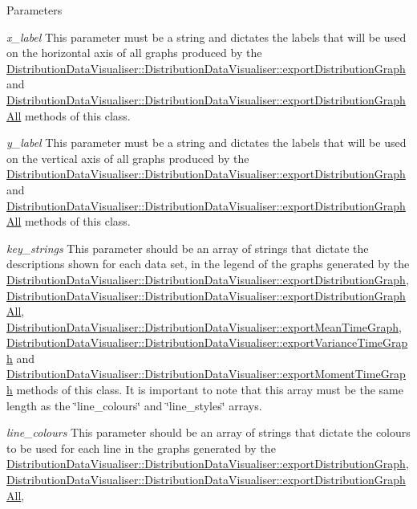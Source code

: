 \begin{DoxyParams}{Parameters}
\item[{\em x\_\-label}]This parameter must be a string and dictates the labels that will be used on the horizontal axis of all graphs produced by the \hyperlink{class_distribution_data_visualiser_1_1_distribution_data_visualiser_af94d7669b055348a4c702ea452e7bec7}{DistributionDataVisualiser::DistributionDataVisualiser::exportDistributionGraph} and \hyperlink{class_distribution_data_visualiser_1_1_distribution_data_visualiser_ab3c06a75bb9d6eaf77e9b81677473079}{DistributionDataVisualiser::DistributionDataVisualiser::exportDistributionGraphAll} methods of this class. \item[{\em y\_\-label}]This parameter must be a string and dictates the labels that will be used on the vertical axis of all graphs produced by the \hyperlink{class_distribution_data_visualiser_1_1_distribution_data_visualiser_af94d7669b055348a4c702ea452e7bec7}{DistributionDataVisualiser::DistributionDataVisualiser::exportDistributionGraph} and \hyperlink{class_distribution_data_visualiser_1_1_distribution_data_visualiser_ab3c06a75bb9d6eaf77e9b81677473079}{DistributionDataVisualiser::DistributionDataVisualiser::exportDistributionGraphAll} methods of this class. \item[{\em key\_\-strings}]This parameter should be an array of strings that dictate the descriptions shown for each data set, in the legend of the graphs generated by the \hyperlink{class_distribution_data_visualiser_1_1_distribution_data_visualiser_af94d7669b055348a4c702ea452e7bec7}{DistributionDataVisualiser::DistributionDataVisualiser::exportDistributionGraph}, \hyperlink{class_distribution_data_visualiser_1_1_distribution_data_visualiser_ab3c06a75bb9d6eaf77e9b81677473079}{DistributionDataVisualiser::DistributionDataVisualiser::exportDistributionGraphAll}, \hyperlink{class_distribution_data_visualiser_1_1_distribution_data_visualiser_afd5e7b189ddc9d35884acc9ea8f62b10}{DistributionDataVisualiser::DistributionDataVisualiser::exportMeanTimeGraph}, \hyperlink{class_distribution_data_visualiser_1_1_distribution_data_visualiser_a7ce1b532faa77577fdafb8512943c922}{DistributionDataVisualiser::DistributionDataVisualiser::exportVarianceTimeGraph} and \hyperlink{class_distribution_data_visualiser_1_1_distribution_data_visualiser_aa43de9f8adeeacc13306f1fbe67cee1b}{DistributionDataVisualiser::DistributionDataVisualiser::exportMomentTimeGraph} methods of this class. It is important to note that this array must be the same length as the \char`\"{}line\_\-colours\char`\"{} and \char`\"{}line\_\-styles\char`\"{} arrays. \item[{\em line\_\-colours}]This parameter should be an array of strings that dictate the colours to be used for each line in the graphs generated by the \hyperlink{class_distribution_data_visualiser_1_1_distribution_data_visualiser_af94d7669b055348a4c702ea452e7bec7}{DistributionDataVisualiser::DistributionDataVisualiser::exportDistributionGraph}, \hyperlink{class_distribution_data_visualiser_1_1_distribution_data_visualiser_ab3c06a75bb9d6eaf77e9b81677473079}{DistributionDataVisualiser::DistributionDataVisualiser::exportDistributionGraphAll}, 
\end{DoxyParams}
